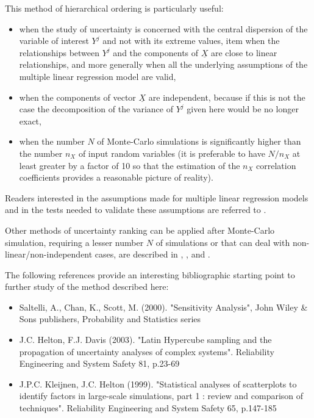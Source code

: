 {
  This method of hierarchical ordering is particularly useful:
  \begin{itemize}
  \item when the study of uncertainty is concerned with the central dispersion of the variable of interest $Y^j$ and not with its extreme values,
    item when the relationships between $Y^j$ and the components of $\underline{X}$ are close to linear relationships, and more generally when all the underlying assumptions of the multiple linear regression model are valid,
  \item when the components of vector $\underline{X}$ are independent, because if this is not the case the decomposition of the variance of $Y^j$ given here would be no longer exact,
  \item when the number $N$ of Monte-Carlo simulations is significantly higher than the number $n_X$ of input random variables (it is preferable to have $N/n_X$ at least greater by a factor of 10 so that the estimation of the $n_X$ correlation coefficients provides a reasonable picture of reality).
  \end{itemize}

  Readers interested in the assumptions made for multiple linear regression models and in the tests needed to validate these assumptions are referred to .

  Other methods of uncertainty ranking can be applied after Monte-Carlo simulation, requiring a lesser number $N$ of simulations or that can deal with non-linear/non-independent cases, are described in , ,  and .

  The following references provide an interesting bibliographic starting point to further study of the method described here:
  \begin{itemize}
  \item Saltelli, A., Chan, K., Scott, M. (2000). "Sensitivity Analysis", John Wiley \& Sons publishers, Probability and Statistics series
  \item J.C. Helton, F.J. Davis (2003). "Latin Hypercube sampling and the propagation of uncertainty analyses of complex systems". Reliability Engineering and System Safety 81, p.23-69
  \item J.P.C. Kleijnen, J.C. Helton (1999). "Statistical analyses of scatterplots to identify factors in large-scale simulations, part 1 : review and comparison of techniques". Reliability Engineering and System Safety 65, p.147-185
  \end{itemize}
}
